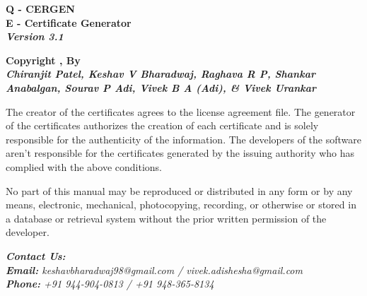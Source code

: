 

\begin{titlingpage}
	
\vspace{2cm}

\centering
{
	\Large{
		\textbf{Q - CERGEN}\\
		\textbf{E - Certificate Generator}\\
		\textbf{\textit{Version 3.1}}}
	\vspace{2cm}
	
	\Large\textbf{Copyright ,  By}\\
	\vspace{0.5cm}
	\large\textbf{\textit{Chiranjit Patel, Keshav V Bharadwaj, Raghava R P, Shankar Anabalgan, Sourav P Adi, Vivek B A (Adi), \& Vivek Urankar}}
	\vspace{2.5cm}
}


The creator of the certificates agrees to the license agreement file. The generator of the certificates authorizes the creation of each certificate and is solely responsible for the authenticity of the information. The developers of the software aren't responsible for the certificates generated by the issuing authority who has complied with the above conditions.

\vspace{2cm}

No part of this manual may be reproduced or distributed in any form or by any means, electronic, mechanical, photocopying, recording, or otherwise or stored in a database or retrieval system without the prior written permission of the developer.

\vspace{0.5cm}

\begin{flushleft}
	\large\textit{\textbf{Contact Us:}}\\
	\textit{\textbf{Email:} keshavbharadwaj98@gmail.com / vivek.adishesha@gmail.com}\\
	\textit{\textbf{Phone:} +91 944-904-0813 / +91 948-365-8134}
\end{flushleft}
	
	
	
	
\end{titlingpage}


